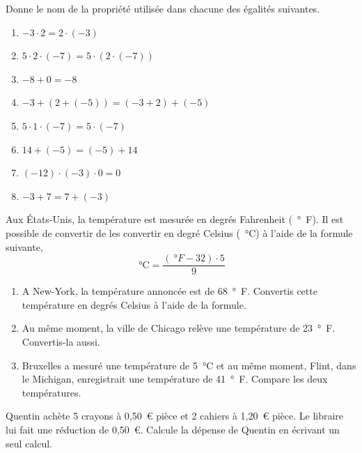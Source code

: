 \documentclass[../../syllabus_1.tex]{subfiles}
\begin{document}
\begin{exercise}
    Donne le nom de la propriété utilisée dans chacune des égalités suivantes.
    \begin{enumerate}[cols=2, itemsep=.4cm]
        \item \(- 3 \cdot 2 = 2 \cdot ( - 3)\)
        \item \(5 \cdot 2 \cdot ( - 7) = 5 \cdot \left( 2 \cdot ( - 7) \right)\)
        \item \(- 8 + 0 = - 8\)
        \item \(- 3 + \left( 2 + ( - 5) \right) = ( - 3 + 2) + ( - 5)\)
        \item \(5 \cdot 1 \cdot ( - 7) = 5 \cdot ( - 7)\)
        \item \(14 + ( - 5) = ( - 5) + 14\ \)
        \item \(( - 12) \cdot ( - 3) \cdot 0 = 0\)
        \item $-3+7 = 7 + (-3)$
    \end{enumerate}
\end{exercise}

\begin{exercise}
    Aux États-Unis, la température est mesurée en degrés Fahrenheit (\SI{}{\degree F}). Il est possible de convertir de les convertir en degré Celsius (\SI{}{\degreeCelsius}) à l'aide de la formule suivante,
    \[\SI{}{\degreeCelsius}=\frac{(\SI{}{\degree F} - 32)\cdot 5}{9}\]
    \begin{enumerate}
        \item A New-York, la température annoncée est de \SI{68}{\degree F}. Convertis  cette température en degrés Celsius à l'aide de la formule.

        \item Au même moment, la ville de Chicago relève une température de \SI{23}{\degree F}. Convertis-la aussi.

        \item  Bruxelles a mesuré une température de \SI{5}{\degreeCelsius} et au même moment, Flint, dans le Michigan, enregistrait une température de \SI{41}{\degree F}. Compare les deux températures.
    \end{enumerate}
\end{exercise}

\begin{exercise}
    Quentin achète 5 crayons à 0,50~€ pièce et 2 cahiers à 1,20~€ pièce. Le libraire lui fait une réduction de 0,50~€. Calcule la dépense de Quentin en écrivant un seul calcul.
\end{exercise}
\end{document}
